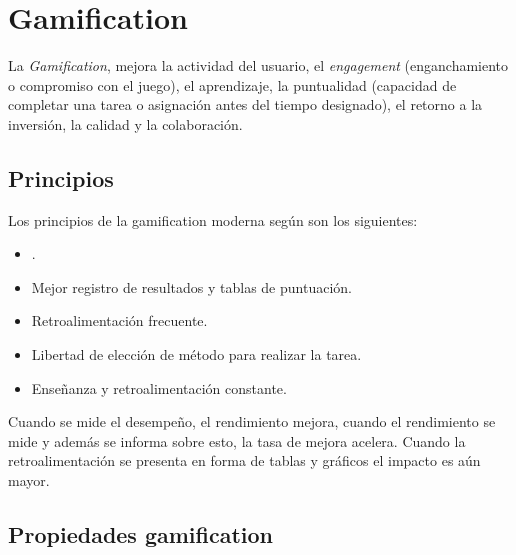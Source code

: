 \section{Gamification}
\label{sec:tics_GAMIFICATION}



La \emph{Gamification}, mejora la actividad del usuario, el \emph{engagement}
(enganchamiento o compromiso con el juego), el aprendizaje, la puntualidad
(capacidad de completar una tarea o asignación antes del tiempo designado), el
retorno a la inversión, la calidad y la colaboración.

\subsection{Principios}

Los principios de la gamification moderna según \cite{hj:gamification} son los
siguientes:

\begin{itemize}
    \item {}.
    \item Mejor registro de resultados y tablas de puntuación.
    \item Retroalimentación frecuente.
    \item Libertad de elección de método para realizar la
        tarea.
    \item Enseñanza y retroalimentación constante.
\end{itemize}


Cuando se mide el desempeño, el rendimiento mejora, cuando el rendimiento se
mide y además se informa sobre esto, la tasa de mejora acelera. Cuando la
retroalimentación se presenta en forma de tablas y gráficos el impacto es aún
mayor.

\subsection{Propiedades gamification}

